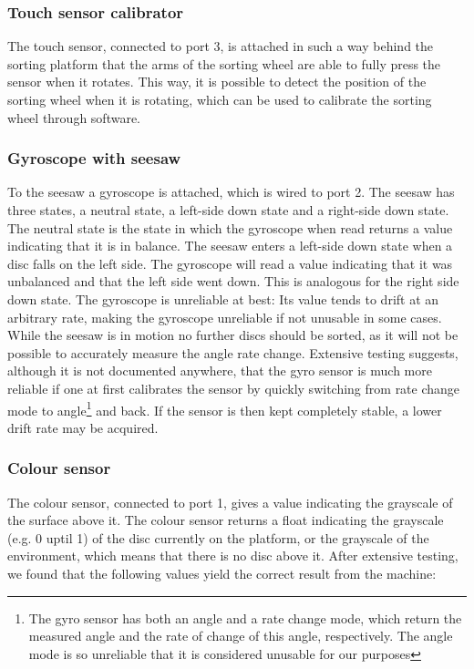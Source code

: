 \documentclass[a4paper,oneside,11pt]{article}
\begin{document}
\subsubsection{Touch sensor calibrator}
The touch sensor, connected to port 3, is attached in such a way behind the sorting platform that the arms of the sorting wheel are able to fully press the sensor when it rotates. This way, it is possible to detect the position of the sorting wheel when it is rotating, which can be used to calibrate the sorting wheel through software.

\subsubsection{Gyroscope with seesaw}
To the seesaw a gyroscope is attached, which is wired to port 2. The seesaw has three states, a neutral state, a left-side down state and a right-side down state. The neutral state is the state in which the gyroscope when read returns a value indicating that it is in balance. The seesaw enters a left-side down state when a disc falls on the left side. The gyroscope will read a value indicating that it was unbalanced and that the left side went down.
This is analogous for the right side down state. The gyroscope is unreliable at best: Its value tends to drift at an arbitrary rate, making the gyroscope unreliable if not unusable in some cases. While the seesaw is in motion no further discs should be sorted, as it will not be possible to accurately measure the angle rate change. Extensive testing suggests, although it is not documented anywhere, that the gyro sensor is much more reliable if one at first calibrates the sensor by quickly switching from rate change mode to angle\footnote{The gyro sensor has both an angle and a rate change mode, which return the measured angle and the rate of change of this angle, respectively. The angle mode is so unreliable that it is considered unusable for our purposes} and back. If the sensor is then kept completely stable, a lower drift rate may be acquired.

\subsubsection{Colour sensor}
The colour sensor, connected to port 1, gives a value indicating the grayscale of the surface above it. The colour sensor returns a float indicating the grayscale (e.g. 0 uptil 1) of the disc currently on the platform, or the grayscale of the environment, which means that there is no disc above it. After extensive testing, we found that the following values yield the correct result from the machine:
\end{document}
